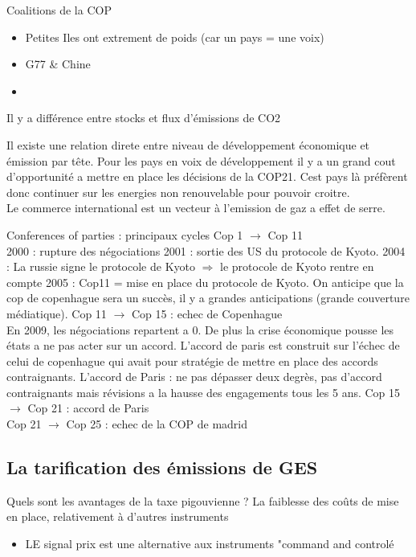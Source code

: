 \documentclass{article}
\begin{document}
Coalitions de la COP 
\begin{itemize}
	\item Petites Iles ont extrement de poids (car un pays = une voix)
	\item G77 & Chine
	\item  
\end{itemize}

Il y a différence entre stocks et flux d'émissions de CO2 

Il existe une relation direte entre niveau de développement économique et émission par tête. 
Pour les pays en voix de développement il y a un grand cout d'opportunité a mettre en place les décisions de la COP21. Cest pays là préfèrent donc continuer sur les energies non renouvelable pour pouvoir croitre.\\

Le commerce international est un vecteur à l'emission de gaz a effet de serre.

Conferences of parties : principaux cycles 
Cop 1 $\rightarrow$ Cop 11 \\
2000 : rupture des négociations 
2001 : sortie des US du protocole de Kyoto.
2004 : La russie signe le protocole de Kyoto $\Rightarrow$ le protocole de Kyoto rentre en compte 
2005 : Cop11  = mise en place du protocole de Kyoto.
On anticipe que la cop de copenhague sera un succès, il y a grandes anticipations (grande couverture médiatique).
Cop 11 $\rightarrow$ Cop 15 : echec de Copenhague \\
En 2009, les négociations repartent a 0. De plus la crise économique pousse les états a ne pas acter sur un accord. 
L'accord de paris est construit sur l'échec de celui de copenhague qui avait pour stratégie de mettre en place des accords contraignants. L'accord de Paris : ne pas dépasser deux degrès, pas d'accord contraignants mais révisions a la hausse des engagements tous les 5 ans. 
Cop 15 $\rightarrow$ Cop 21 : accord de Paris \\
Cop 21 $\rightarrow$ Cop 25 : echec de la COP de madrid \\

\subsection{La tarification des émissions de GES}

Quels sont les avantages de la taxe pigouvienne ?
La faiblesse des coûts de mise en place, relativement à d'autres instruments 
\begin{itemize}
	\item LE signal prix est une alternative aux instruments "command and controlé
\end{itemize}
\end{document}
